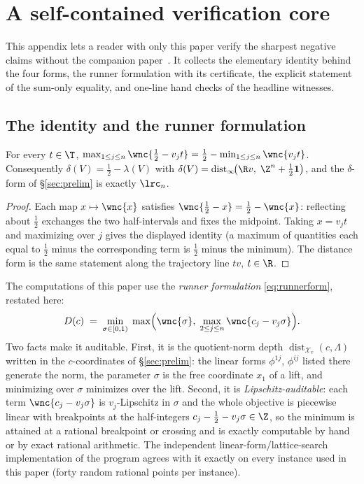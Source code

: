 
\section{A self-contained verification core}\label{sec:self}

This appendix lets a reader with only this paper verify the sharpest
negative claims without the companion paper~\cite{companion-monograph}. It collects the
elementary identity behind the four forms, the runner formulation with
its certificate, the explicit statement of the sum-only equality, and
one-line hand checks of the headline witnesses.

\subsection{The identity and the runner formulation}

\begin{lemma}\label{lem:depthid}
For every $t\in\T$,
$\max_{1\le j\le n}\wnc{\tfrac12-v_jt}=\tfrac12-\min_{1\le j\le n}\wnc{v_jt}$.
Consequently $\delta(V)=\tfrac12-\lambda(V)$ with
$\delta(V)=\operatorname{dist}_\infty\!\bigl(\R v,\;\Z^n+\tfrac12\mathbf{1}
\bigr)$, and the $\delta$-form of \S\ref{sec:prelim} is exactly
$\lrc_n$.
\end{lemma}

\begin{proof}
Each map $x\mapsto\wnc{x}$ satisfies
$\wnc{\tfrac12-x}=\tfrac12-\wnc{x}$: reflecting about $\tfrac12$
exchanges the two half-intervals and fixes the midpoint. Taking $x=v_jt$
and maximizing over $j$ gives the displayed identity (a maximum of
quantities each equal to $\tfrac12$ minus the corresponding term is
$\tfrac12$ minus the minimum). The distance form is the same statement
along the trajectory line $tv$, $t\in\R$.
\end{proof}

The computations of this paper use the \emph{runner formulation}
\eqref{eq:runnerform}, restated here:
\[
D(c)\;=\;\min_{\sigma\in[0,1)}\;\max\Bigl(\wnc{\sigma},\;
\max_{2\le j\le n}\wnc{c_j-v_j\sigma}\Bigr).
\]
Two facts make it auditable. First, it is the quotient-norm depth
$\operatorname{dist}_{\mathcal{X}_v}(c,\Lambda)$ written in the
$c$-coordinates of \S\ref{sec:prelim}: the linear forms $\phi^{1j}$,
$\phi^{ij}$ listed there generate the norm, the parameter $\sigma$ is the
free coordinate $x_1$ of a lift, and minimizing over $\sigma$ minimizes
over the lift. Second, it is \emph{Lipschitz-auditable}: each term
$\wnc{c_j-v_j\sigma}$ is $v_j$-Lipschitz in $\sigma$ and the whole
objective is piecewise linear with breakpoints at the half-integers
$c_j-\tfrac12-v_j\sigma\in\Z$, so the minimum is attained at a rational
breakpoint or crossing and is exactly computable by hand or by exact
rational arithmetic. The independent linear-form/lattice-search
implementation of the program agrees with it exactly on every instance
used in this paper (forty random rational points per instance).

